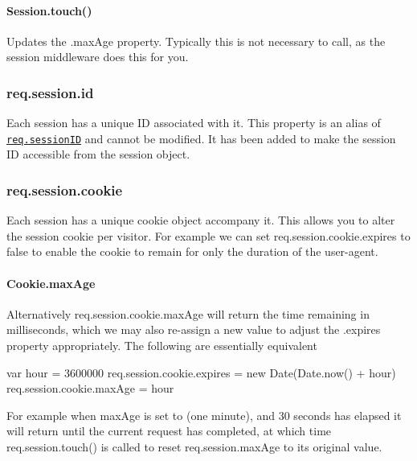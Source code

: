 \paragraph*{Session.\+touch()}

Updates the {\ttfamily .max\+Age} property. Typically this is not necessary to call, as the session middleware does this for you.

\subsubsection*{req.\+session.\+id}

Each session has a unique ID associated with it. This property is an alias of \href{#reqsessionid-1}{\tt {\ttfamily req.\+session\+ID}} and cannot be modified. It has been added to make the session ID accessible from the {\ttfamily session} object.

\subsubsection*{req.\+session.\+cookie}

Each session has a unique cookie object accompany it. This allows you to alter the session cookie per visitor. For example we can set {\ttfamily req.\+session.\+cookie.\+expires} to {\ttfamily false} to enable the cookie to remain for only the duration of the user-\/agent.

\paragraph*{Cookie.\+max\+Age}

Alternatively {\ttfamily req.\+session.\+cookie.\+max\+Age} will return the time remaining in milliseconds, which we may also re-\/assign a new value to adjust the {\ttfamily .expires} property appropriately. The following are essentially equivalent


\begin{DoxyCode}
var hour = 3600000
req.session.cookie.expires = new Date(Date.now() + hour)
req.session.cookie.maxAge = hour
\end{DoxyCode}


For example when {\ttfamily max\+Age} is set to {} (one minute), and 30 seconds has elapsed it will return {} until the current request has completed, at which time {\ttfamily req.\+session.\+touch()} is called to reset {\ttfamily req.\+session.\+max\+Age} to its original value.


